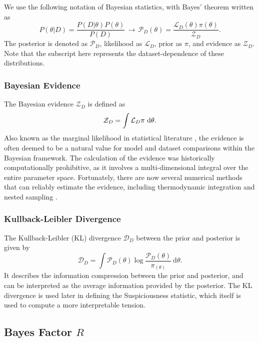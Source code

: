 \documentclass[%
 reprint,
 amsmath,amssymb,
 aps,
]{revtex4-2}
\begin{document}
We use the following notation of Bayesian statistics, with Bayes' theorem written as
\begin{equation}
    P(\theta|D) = \frac{P(D|\theta)P(\theta)}{P(D)} \, \longrightarrow \, \mathcal{P}_D(\theta) = \frac{\mathcal{L}_D(\theta) \pi(\theta)}{\mathcal{Z}_D}.
\end{equation}
The posterior is denoted as $\mathcal{P}_D$, likelihood as $\mathcal{L}_D$, prior as $\pi$, and evidence as $\mathcal{Z}_D$. Note that the subscript here represents the dataset-dependence of these distributions. 

\subsubsection{Bayesian Evidence}
The Bayesian evidence $\mathcal{Z}_D$ is defined as 
\begin{equation}
    \mathcal{Z}_D = \int \mathcal{L}_D \pi \ \rm{d} \theta.
\end{equation}
Also known as the marginal likelihood in statistical literature \cite{Trotta2008}, the evidence is often deemed to be a natural value for model and dataset comparisons within the Bayesian framework. The calculation of the evidence was historically computationally prohibitive, as it involves a multi-dimensional integral over the entire parameter space. Fortunately, there are now several numerical methods that can reliably estimate the evidence, including thermodynamic integration \cite{Lartillot2006} and nested sampling \cite{Skilling2006, Handley2015}.

\subsubsection{Kullback-Leibler Divergence}

The Kullback-Leibler (KL) divergence $\mathcal{D}_D$ between the prior and posterior is given by
\begin{equation}
    \mathcal{D}_D = \int \mathcal{P}_D (\theta) \log \frac{\mathcal{P}_D (\theta)}{\pi_(\theta)} \ \textrm{d}\theta.
\end{equation}
It describes the information compression between the prior and posterior, and can be interpreted as the average information provided by the posterior. The KL divergence is used later in defining the Suspiciousness statistic, which itself is used to compute a more interpretable tension.

\subsection{Bayes Factor $R$}
\end{document}
